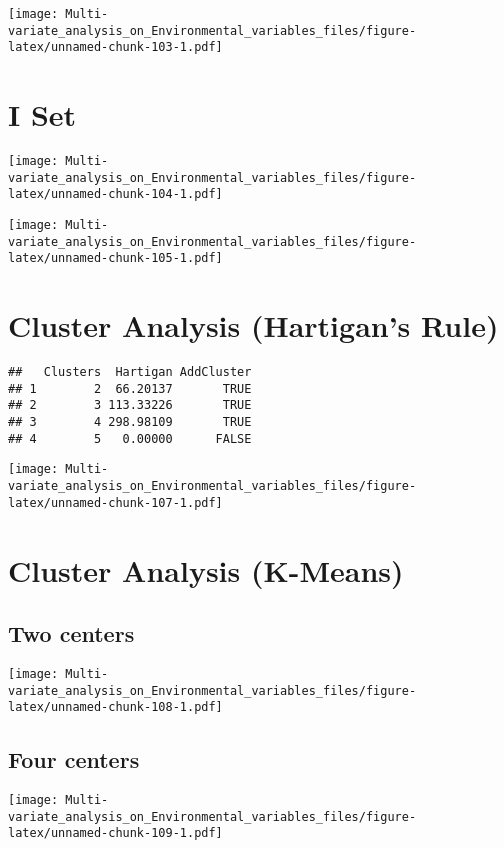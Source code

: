 \documentclass[]{book}
\begin{document}
\texttt{[image: Multi-variate\_analysis\_on\_Environmental\_variables\_files/figure-latex/unnamed-chunk-103-1.pdf]}

\hypertarget{i-set}{%
\section{I Set}\label{i-set}}

\texttt{[image: Multi-variate\_analysis\_on\_Environmental\_variables\_files/figure-latex/unnamed-chunk-104-1.pdf]}

\texttt{[image: Multi-variate\_analysis\_on\_Environmental\_variables\_files/figure-latex/unnamed-chunk-105-1.pdf]}

\hypertarget{cluster-analysis-hartigans-rule}{%
\section{Cluster Analysis (Hartigan's
Rule)}\label{cluster-analysis-hartigans-rule}}

\begin{verbatim}
##   Clusters  Hartigan AddCluster
## 1        2  66.20137       TRUE
## 2        3 113.33226       TRUE
## 3        4 298.98109       TRUE
## 4        5   0.00000      FALSE
\end{verbatim}

\texttt{[image: Multi-variate\_analysis\_on\_Environmental\_variables\_files/figure-latex/unnamed-chunk-107-1.pdf]}

\hypertarget{cluster-analysis-k-means}{%
\section{Cluster Analysis (K-Means)}\label{cluster-analysis-k-means}}

\hypertarget{two-centers}{%
\subsection{Two centers}\label{two-centers}}

\texttt{[image: Multi-variate\_analysis\_on\_Environmental\_variables\_files/figure-latex/unnamed-chunk-108-1.pdf]}

\hypertarget{four-centers}{%
\subsection{Four centers}\label{four-centers}}

\texttt{[image: Multi-variate\_analysis\_on\_Environmental\_variables\_files/figure-latex/unnamed-chunk-109-1.pdf]}
\end{document}
